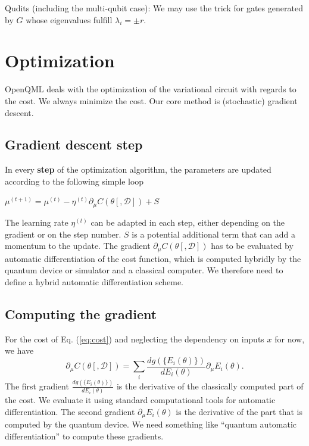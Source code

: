 \documentclass[aps,pra,10pt,twocolumn,groupedaddress,nofootinbib]{revtex4-1}
\theoremstyle{plain}
\begin{document}
Qudits (including the multi-qubit case):
We may use the trick for gates generated by $G$ whose
eigenvalues fulfill $\lambda_i = \pm r$.

\section{Optimization}

OpenQML deals with the optimization of the variational circuit with
regards to the cost. We always minimize the cost. Our core method is
(stochastic) gradient descent.

\subsection{Gradient descent step}
In every \textbf{step} of the optimization algorithm, the parameters are updated according to the following simple loop\\

\begin{algorithmic}[1]
\For {$\mu \in \theta $}
\State $\mu^{(t+1)} = \mu^{(t)} - \eta^{(t)} \partial_{\mu} C(\theta[, \mathcal{D}]) + S$
\EndFor
\EndProcedure
\end{algorithmic}

The learning rate $\eta^{(t)}$ can be adapted in each step, either
depending on the gradient or on the step number. $S$ is a potential
additional term that can add a momentum to the update. The gradient
$\partial_{\mu} C(\theta[, \mathcal{D}])$ has to be evaluated by
automatic differentiation of the cost function, which is computed
hybridly by the quantum device or simulator and a classical
computer. We therefore need to define a hybrid automatic
differentiation scheme.

\subsection{Computing the gradient}
For the cost of Eq. (\ref{eq:cost}) and neglecting the dependency on inputs $x$ for now, we have
\[\partial_{\mu} C(\theta[, \mathcal{D}]) = \sum_i \frac{d g(\{E_i(\theta)\})}{d E_i(\theta)} \partial_{\mu} E_i(\theta). \]
The first gradient $\frac{d g(\{E_i(\theta)\})}{d E_i(\theta)}$ is the
derivative of the classically computed part of the cost. We evaluate
it using standard computational tools for automatic
differentiation. The second gradient $\partial_{\mu} E_i(\theta)$ is
the derivative of the part that is computed by the quantum device. We
need something like ``quantum automatic differentiation'' to compute
these gradients.
\end{document}
